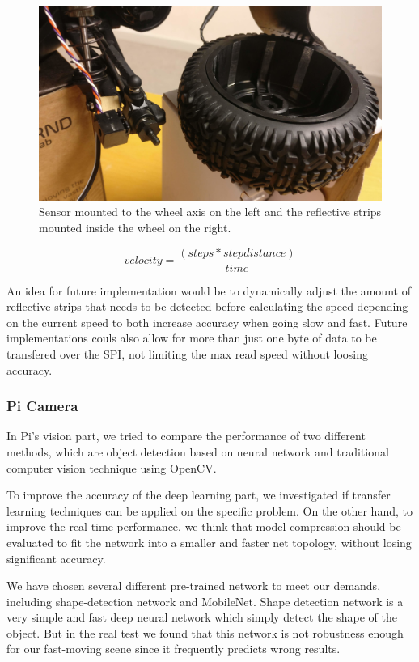 \documentclass[11pt, titlepage]{article} %
\begin{document}
\begin{figure}[]
	\centering
   	\includegraphics[scale=0.5]{speedometer.jpg}
   	\caption{Sensor mounted to the wheel axis on the left and the reflective strips mounted inside the wheel on the right.}
    \label{fig:speedometer}
\end{figure}

\begin{equation}
    velocity = \frac{(steps*stepdistance)}{time}
    \label{eq:velocity}
\end{equation}

An idea for future implementation would be to dynamically adjust the amount of reflective strips that needs to be detected before calculating the speed depending on the current speed to both increase accuracy when going slow and fast. Future implementations couls also allow for more than just one byte of data to be transfered over the SPI, not limiting the max read speed without loosing accuracy.

\subsubsection{Pi Camera}
In Pi’s vision part, we tried to compare the performance of two different methods, which are object detection based on neural network and traditional computer vision technique using OpenCV.

To improve the accuracy of the deep learning part, we investigated if transfer learning techniques can be applied on the specific problem. On the other hand, to improve the real time performance, we think that model compression should be evaluated to fit the network into a smaller and faster net topology, without losing significant accuracy. 

We have chosen several different pre-trained network to meet our demands, including shape-detection network and MobileNet. Shape detection network is a very simple and fast deep neural network which simply detect the shape of the object. But in the real test we found that this network is not robustness enough for our fast-moving scene since it frequently predicts wrong results.
\end{document}
